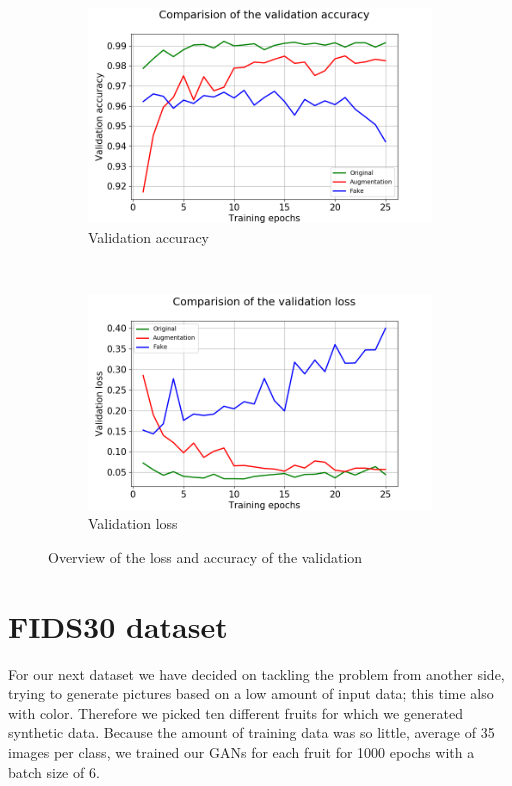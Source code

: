 \documentclass[13pt]{article}
\begin{document}
\begin{figure}[h!]
    \centering
    \begin{subfigure}[b]{0.48\textwidth}
        \includegraphics[width=\textwidth]{plots/mnist/comparision_val_acc.png}
        \caption{Validation accuracy}
    \end{subfigure}
    ~ 
    \begin{subfigure}[b]{0.48\textwidth}
        \includegraphics[width=\textwidth]{plots/mnist/comparision_val_loss.png}
        \caption{Validation loss}
    \end{subfigure}
    \caption{Overview of the loss and accuracy of the validation}
    \label{fig:mnist_validation}
\end{figure}


\section{FIDS30 dataset}\label{FIDS30}
For our next dataset we have decided on tackling the problem from another side, trying to generate pictures based on a low amount of input data; this time also with color. Therefore we picked ten different fruits for which we generated synthetic data. Because the amount of training data was so little, average of 35 images per class, we trained our GANs for each fruit for 1000 epochs with a batch size of 6.
\end{document}
